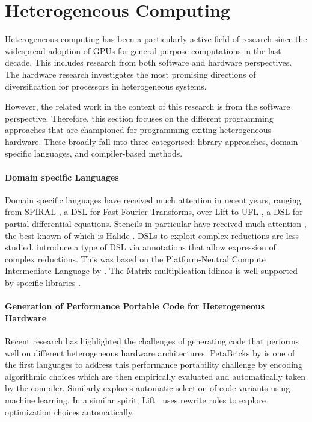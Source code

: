 \section{Heterogeneous Computing}

    Heterogeneous computing has been a particularly active field of research
    since the widespread adoption of GPUs for general purpose computations in
    the last decade.
    This includes research from both software and hardware perspectives.
    The hardware research investigates the most promising directions of
    diversification for processors in heterogeneous systems.
    
    However, the related work in the context of this research is from
    the software perspective.
    Therefore, this section focuses on the different programming approaches that
    are championed for programming exiting heterogeneous hardware.
    These broadly fall into three categorised: library approaches,
    domain-specific languages, and compiler-based methods.

\paragraph*{Domain specific Languages}
    Domain specific languages have received much attention in recent years,
    ranging from SPIRAL \citep{ofenbeck13spiral}, a DSL for Fast Fourier
    Transforms, over Lift \citep{steuwer15rewrite, SteuwerRD17,HagedornSSGD18}
    to UFL \citep{Alnaes:2014:UFL:2594412.2566630}, a DSL for partial
    differential equations.
    Stencils in particular have received much attention
    \citep{Mullapudi:2015:PAO:2694344.2694364,HagedornSSGD18}, the best known of
    which is Halide \citep{Ragan-Kelley2013Halide}.
    DSLs to exploit complex reductions are less studied.
    \citet{Reddy2016Reduction} introduce a type of DSL via annotations
    that allow expression of complex reductions.
    This was based on the  Platform-Neutral Compute Intermediate Language by
    \citet{baghdadi2015PENCIL}.
    The Matrix multiplication idimos is well supported by
    specific libraries \citep{clblas,mkl,cublas}.

\paragraph*{Generation of Performance Portable Code for Heterogeneous Hardware}
    Recent research has highlighted the challenges of generating code that
    performs well on different heterogeneous hardware architectures.
    PetaBricks by \citet{PhothilimthanaARA13} is one of the first languages to
    address this performance portability challenge by encoding algorithmic
    choices which are then empirically evaluated and automatically taken by the
    compiler.
    Similarly \cite{MuralidharanRHG16} explores automatic selection of code
    variants using machine learning.
    In a similar spirit, Lift~\cite{steuwer15rewrite} uses rewrite rules to
    explore optimization choices automatically.

